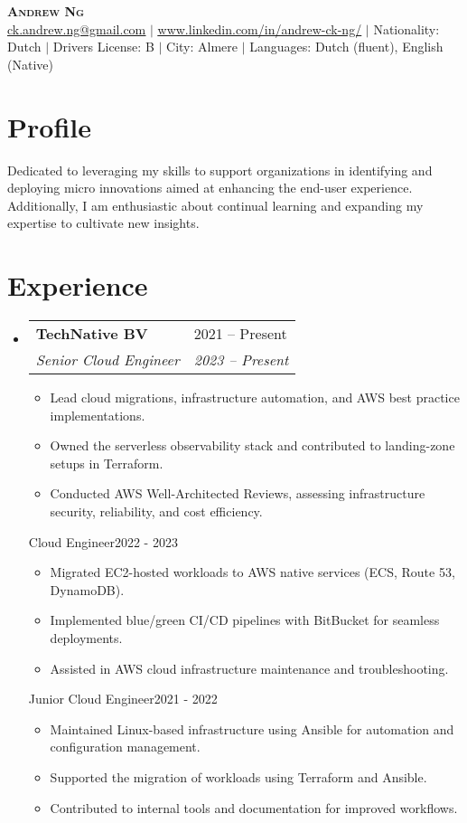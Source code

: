 \documentclass[letterpaper,11pt]{article}
\makeatletter
\newcommand{\resumeItem}[1]{\item\small{{#1 \vspace{-2pt}}}}
\newcommand{\resumeSubheading}[4]{
  \vspace{-2pt}\item
    \begin{tabular*}{\textwidth}{@{\extracolsep{\fill}}p{0.85\textwidth} p{0.20\textwidth}@{}}
      \textbf{#1} & #2 \\
      \textit{\small#3} & \textit{\small #4} \\
    \end{tabular*}\vspace{-7pt}
}
\newcommand{\resumeSubHeadingListStart}{\begin{itemize}[leftmargin=0.15in, label={}]}
\newcommand{\resumeSubHeadingListEnd}{\end{itemize}}
\newcommand{\resumeItemListStart}{\begin{itemize}}
\newcommand{\resumeItemListEnd}{\end{itemize}\vspace{2pt}}
\makeatother
\begin{document}

\begin{center}
    \textbf{\Huge \scshape Andrew Ng} \\ \vspace{1pt}
    \href{mailto:x@x.com}{\underline{ck.andrew.ng@gmail.com}} $|$ 
    \href{https://linkedin.com/in/...}{\underline{www.linkedin.com/in/andrew-ck-ng/}} $|$
    \small Nationality: Dutch $|$ 
    {\small{Drivers License: B}} $|$  {\small{City: Almere}} $|$  
    {\small{Languages: Dutch (fluent), English (Native) }}
\end{center}

\section{Profile}
{\small{Dedicated to leveraging my skills to support organizations in identifying and deploying micro innovations aimed at enhancing the end-user experience. Additionally, I am enthusiastic about continual learning and expanding my expertise to cultivate new insights.}}

\vspace{0.3cm}
\section{Experience}
  \resumeSubHeadingListStart
    \resumeSubheading
      {TechNative BV}{2021 -- Present}
      {Senior Cloud Engineer}{2023 -- Present}
        \resumeItemListStart
          \resumeItem{Lead cloud migrations, infrastructure automation, and AWS best practice implementations.}
          \resumeItem{Owned the serverless observability stack and contributed to landing-zone setups in Terraform.}
          \resumeItem{Conducted AWS Well-Architected Reviews, assessing infrastructure security, reliability, and cost efficiency.}
        \resumeItemListEnd
      {Cloud Engineer}{2022 - 2023}
      \resumeItemListStart
        \resumeItem{Migrated EC2-hosted workloads to AWS native services (ECS, Route 53, DynamoDB).}
        \resumeItem{Implemented blue/green CI/CD pipelines with BitBucket for seamless deployments.}
        \resumeItem{Assisted in AWS cloud infrastructure maintenance and troubleshooting.}
      \resumeItemListEnd
      {Junior Cloud Engineer}{2021 - 2022}
      \resumeItemListStart
        \resumeItem{Maintained Linux-based infrastructure using Ansible for automation and configuration management.}
        \resumeItem{Supported the migration of workloads using Terraform and Ansible.}
        \resumeItem{Contributed to internal tools and documentation for improved workflows.}
      \resumeItemListEnd
  \resumeSubHeadingListEnd
\end{document}
